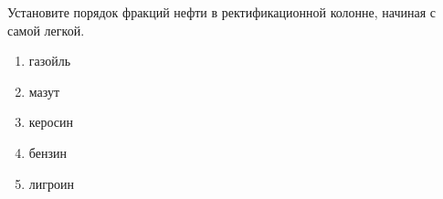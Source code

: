 Установите порядок фракций нефти в ректификационной колонне, начиная с самой легкой.\\
\begin{enumerate}
    \item газойль
    \item мазут
    \item керосин
    \item бензин
    \item лигроин
\end{enumerate}

    